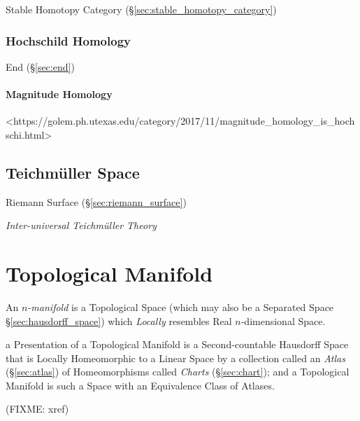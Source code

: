 Stable Homotopy Category (\S\ref{sec:stable_homotopy_category})



\subsubsection{Hochschild Homology}\label{sec:hochschild_homology}

End (\S\ref{sec:end})



\paragraph{Magnitude Homology}\label{sec:magnitude_homology}\hfill

<https://golem.ph.utexas.edu/category/2017/11/magnitude_homology_is_hochschi.html>



\subsection{Teichm\"uller Space}\label{sec:teichmuller_space}

Riemann Surface (\S\ref{sec:riemann_surface})

\emph{Inter-universal Teichm\"uller Theory} %



\section{Topological Manifold}\label{sec:topological_manifold}

An \emph{$n$-manifold} is a Topological Space (which may also be a Separated
Space \S\ref{sec:hausdorff_space}) which \emph{Locally} resembles Real
$n$-dimensional Space.

a Presentation of a Topological Manifold is a Second-countable Hausdorff Space
that is Locally Homeomorphic to a Linear Space by a collection called an
\emph{Atlas} (\S\ref{sec:atlas}) of Homeomorphisms called \emph{Charts}
(\S\ref{sec:chart}); and a Topological Manifold is such a Space with an
Equivalence Class of Atlases.

(FIXME: xref)

